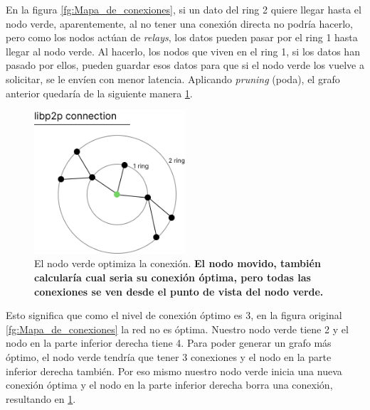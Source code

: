 En la figura \ref{fg:Mapa_de_conexiones}, si un dato del ring 2 quiere llegar hasta el nodo verde, aparentemente, al no tener una conexión directa no podría hacerlo, pero como los nodos actúan de \textit{relays}, los datos pueden pasar por el ring 1 hasta llegar al nodo verde.
Al hacerlo, los nodos que viven en el ring 1, si los datos han pasado por ellos, pueden guardar esos datos para que si el nodo verde los vuelve a solicitar, se le envíen con menor latencia.
Aplicando \textit{pruning} (poda), el grafo anterior quedaría de la siguiente manera \ref{fg:mapa_optimizado}.
\begin{figure}[H]
    \centering
    \includegraphics[width=0.5\textwidth]{Figures/Radios de comunicacion optimizado.png}
    \caption[El nodo verde optimiza la conexión]{El nodo verde optimiza la conexión. \textbf{El nodo movido, también calcularía cual seria su conexión óptima, pero todas las conexiones se ven desde el punto de vista del nodo verde.}}
    \label{fg:mapa_optimizado}
\end{figure}
Esto significa que como el nivel de conexión óptimo es 3, en la figura original \ref{fg:Mapa_de_conexiones} la red no es óptima. Nuestro nodo verde tiene 2 y el nodo en la parte inferior derecha tiene 4. Para poder generar un grafo más óptimo, el nodo verde tendría que tener 3 conexiones y el nodo en la parte inferior derecha también. Por eso mismo nuestro nodo verde inicia una nueva conexión óptima y el nodo en la parte inferior derecha borra una conexión, resultando en \ref{fg:mapa_optimizado}.
